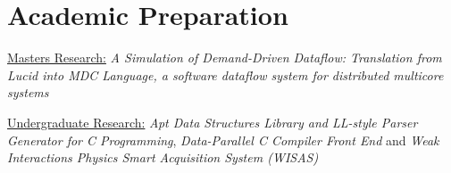 \section{Academic Preparation}



{\vspace{3pt}\underline{Masters Research:} \textit{A Simulation of Demand-Driven Dataflow: Translation from Lucid into MDC Language, a software dataflow system for distributed multicore systems}}{\vspace{3pt}}

{\vspace{3pt}\underline{Undergraduate Research:} \textit{Apt Data Structures Library and LL-style Parser Generator for C Programming}, \textit{Data-Parallel C Compiler Front End} and \textit{Weak Interactions Physics Smart Acquisition System (WISAS)}}{\vspace{3pt}}

